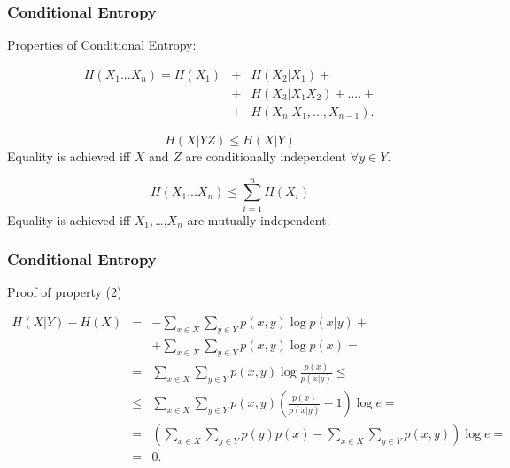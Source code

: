 \documentclass[14pt]{beamer}
\begin{document}
\begin{frame}
\frametitle{Conditional Entropy}
Properties of Conditional Entropy:
\begin{itemize}
\footnotesize {
    
    \item[4]
    \begin{prop}\label{CE4}
    \begin{eqnarray}
    H(X_1 ...X_n ) = H(X_1 ) &+& H(X_2 \vert X_1 ) + \nonumber\\
                             &+& H(X_3 \vert X_1 X_2 ) + .... + \nonumber\\
                             &+& H(X_n \vert X_1 ,...,X_{n - 1} ).\nonumber
    \end{eqnarray}
    
    \item[5]
    \end{prop}
    \begin{prop}\label{CE5}
    \[H(X\vert YZ) \le H(X\vert Y)\]
    Equality is achieved iff $X$ and $Z$ are conditionally independent $\forall y \in Y$.
    \end{prop}

    \item[6]
    \begin{prop}
    \label{CE6} \[H(X_1 ...X_n ) \le \sum\limits_{i = 1}^n {H(X_i )}\] 
    Equality is achieved iff $X_1 ,$\ldots ,$X_n $ are mutually independent.
    \end{prop}
}    
\end{itemize}
\end{frame}



\begin{frame}
\frametitle{Conditional Entropy}
Proof of property (2)
\begin{itemize}
\footnotesize {

    \item
    \begin{eqnarray*}
     H(X\vert Y) - H(X) &=&
    - \sum_{x\in X}{\sum_{y \in Y}{p(x,y)\log p(x\vert y)} }+  \\
    &&+\sum_{x \in X} {\sum_{y \in Y} {p(x,y)\log p(x)} } =     \\
    &=& \sum_{x \in X} {\sum_{y \in Y} {p(x,y)\log \frac{p(x)}{p(x\vert
                 y)} \le } } \\
    &\le& \sum_{x \in X} {\sum_{y \in Y} {p(x,y)\left(
    {\frac{p(x)}{p(x\vert y)} - 1} \right)} } \log e =  \\
    &=& \left( {\sum\limits_{x \in X} {\sum\limits_{y \in Y} {p(y)p(x)}
    - } \sum\limits_{x \in X} {\sum\limits_{y \in Y} {p(x,y)} } }
    \right)\log e =\\
    &=& 0.
    \end{eqnarray*}

}
\end{itemize}
\end{frame}
\end{document}
